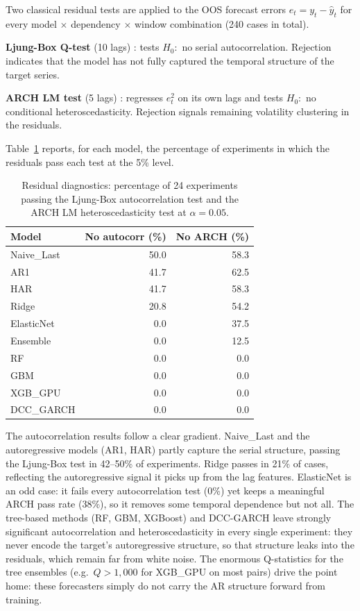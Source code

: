 Two classical residual tests are applied to the OOS forecast errors
$e_t = y_t - \hat{y}_t$ for every model $\times$ dependency $\times$ window
combination (240 cases in total).

\textbf{Ljung-Box Q-test} (10 lags) \cite{ljung1978measure}: tests $H_0{:}$ no serial autocorrelation.
Rejection indicates that the model has not fully captured the temporal structure
of the target series.

\textbf{ARCH LM test} (5 lags) \cite{engle1982arch}: regresses $e_t^2$ on its own lags and tests
$H_0{:}$ no conditional heteroscedasticity.
Rejection signals remaining volatility clustering in the residuals.

Table~\ref{tab:resid_summary} reports, for each model, the percentage of
experiments in which the residuals pass each test at the 5\% level.

\begin{table}[H]
    \centering
    \caption{Residual diagnostics: percentage of 24 experiments passing the
             Ljung-Box autocorrelation test and the ARCH LM heteroscedasticity
             test at $\alpha = 0.05$.}
    \label{tab:resid_summary}
    \begin{tabular}{lrr}
        \toprule
        Model & No autocorr (\%) & No ARCH (\%) \\
        \midrule
        Naive\_Last & 50.0 & 58.3 \\
        AR1         & 41.7 & 62.5 \\
        HAR         & 41.7 & 58.3 \\
        Ridge       & 20.8 & 54.2 \\
        ElasticNet  &  0.0 & 37.5 \\
        Ensemble    &  0.0 & 12.5 \\
        RF          &  0.0 &  0.0 \\
        GBM         &  0.0 &  0.0 \\
        XGB\_GPU    &  0.0 &  0.0 \\
        DCC\_GARCH  &  0.0 &  0.0 \\
        \bottomrule
    \end{tabular}
\end{table}

The autocorrelation results follow a clear gradient. Naive\_Last and the
autoregressive models (AR1, HAR) partly capture the serial structure,
passing the Ljung-Box test in 42--50\% of experiments. Ridge passes in
21\% of cases, reflecting the autoregressive signal it picks up from the
lag features. ElasticNet is an odd case: it fails every autocorrelation
test (0\%) yet keeps a meaningful ARCH pass rate (38\%), so it removes some
temporal dependence but not all. The tree-based methods (RF, GBM, XGBoost)
and DCC-GARCH leave strongly significant autocorrelation and
heteroscedasticity in every single experiment: they never encode the
target's autoregressive structure, so that structure leaks into the
residuals, which remain far from white noise. The enormous Q-statistics for
the tree ensembles (e.g.\ $Q > 1{,}000$ for XGB\_GPU on most pairs) drive the
point home: these forecasters simply do not carry the AR structure forward
from training.


